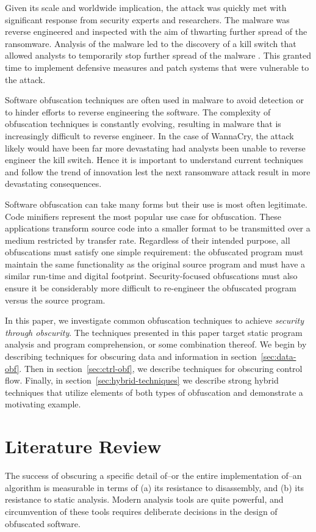 \documentclass[conference]{IEEEtran}
\begin{document}
Given its scale and worldwide implication, the attack was quickly met with significant response from security experts and researchers. The malware was reverse engineered and inspected with the aim of thwarting further spread of the ransomware. Analysis of the malware led to the discovery of a kill switch that allowed analysts to temporarily stop further spread of the malware \cite{b2}. This granted time to implement defensive measures and patch systems that were vulnerable to the attack.

Software obfuscation techniques are often used in malware to avoid detection or to hinder efforts to reverse engineering the software. The complexity of obfuscation techniques is constantly evolving, resulting in malware that is increasingly difficult to reverse engineer. In the case of WannaCry, the attack likely would have been far more devastating had analysts been unable to reverse engineer the kill switch. Hence it is important to understand current techniques and follow the trend of innovation lest the next ransomware attack result in more devastating consequences.

Software obfuscation can take many forms but their use is most often legitimate. Code minifiers represent the most popular use case for obfuscation. These applications transform source code into a smaller format to be transmitted over a medium restricted by transfer rate. Regardless of their intended purpose, all obfuscations must satisfy one simple requirement: the obfuscated program must maintain the same functionality as the original source program and must have a similar run-time and digital footprint. Security-focused obfuscations must also ensure it be considerably more difficult to re-engineer the obfuscated program versus the source program.

In this paper, we investigate common obfuscation techniques to achieve \textit{security through obscurity}. The techniques presented in this paper target static program analysis and program comprehension, or some combination thereof. We begin by describing techniques for obscuring data and information in section~\ref{sec:data-obf}. Then in section~\ref{sec:ctrl-obf}, we describe techniques for obscuring control flow. Finally, in section~\ref{sec:hybrid-techniques} we describe strong hybrid techniques that utilize elements of both types of obfuscation and demonstrate a motivating example.

\section{Literature Review}
\label{sec:lit-review}
The success of obscuring a specific detail of--or the entire implementation of--an algorithm is measurable in terms of (a) its resistance to disassembly, and (b) its resistance to static analysis. Modern analysis tools are quite powerful, and circumvention of these tools requires deliberate decisions in the design of obfuscated software.
\end{document}
